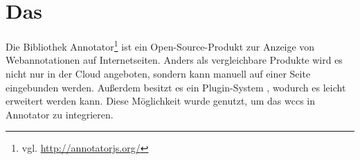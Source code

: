 \section{Das {\annotatorPlugin}}
    \label{section:solutionDetailsAnnotatorPlugin}
    Die Bibliothek Annotator\footnote{vgl. \url{http://annotatorjs.org/}}
    ist ein Open-Source-Produkt zur Anzeige von Webannotationen auf Internetseiten.
    Anders als vergleichbare Produkte wird es nicht nur in der Cloud angeboten,
    sondern kann manuell auf einer Seite eingebunden werden.
    Außerdem besitzt es ein Plugin-System \cite[Kapitel "`Plugin development"']{annotator:documentation}, wodurch es leicht erweitert werden kann.
    Diese Möglichkeit wurde genutzt,
    um das \gls{wccs} in Annotator zu integrieren.

    
    